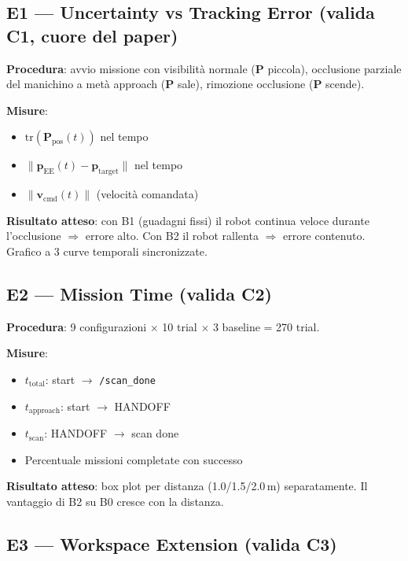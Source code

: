 \documentclass[a4paper,11pt]{article}
\begin{document}
\subsection*{E1 — Uncertainty vs Tracking Error \textnormal{(valida C1, cuore del paper)}}

\textbf{Procedura}: avvio missione con visibilità normale ($\mathbf{P}$ piccola),
occlusione parziale del manichino a metà approach ($\mathbf{P}$ sale),
rimozione occlusione ($\mathbf{P}$ scende).

\textbf{Misure}:
\begin{itemize}
  \item $\mathrm{tr}(\mathbf{P}_{\text{pos}}(t))$ nel tempo
  \item $\|\mathbf{p}_{\text{EE}}(t) - \mathbf{p}_{\text{target}}\|$ nel tempo
  \item $\|\mathbf{v}_{\text{cmd}}(t)\|$ (velocità comandata)
\end{itemize}

\textbf{Risultato atteso}: con B1 (guadagni fissi) il robot continua veloce
durante l'occlusione $\Rightarrow$ errore alto. Con B2 il robot rallenta
$\Rightarrow$ errore contenuto. Grafico a 3 curve temporali sincronizzate.

\subsection*{E2 — Mission Time \textnormal{(valida C2)}}

\textbf{Procedura}: 9 configurazioni $\times$ 10 trial $\times$ 3 baseline = 270 trial.

\textbf{Misure}:
\begin{itemize}
  \item $t_{\text{total}}$: start $\to$ \texttt{/scan\_done}
  \item $t_{\text{approach}}$: start $\to$ HANDOFF
  \item $t_{\text{scan}}$: HANDOFF $\to$ scan done
  \item Percentuale missioni completate con successo
\end{itemize}

\textbf{Risultato atteso}: box plot per distanza (1.0/1.5/2.0\,m) separatamente.
Il vantaggio di B2 su B0 cresce con la distanza.

\subsection*{E3 — Workspace Extension \textnormal{(valida C3)}}
\end{document}
